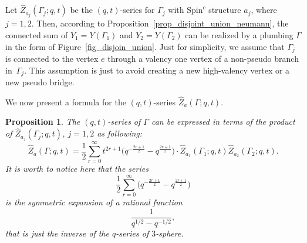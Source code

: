 \documentclass[pdftex]{sigma}
\numberwithin{equation}{section}
\newtheorem{Proposition}[Theorem]{Proposition}
\begin{document}
Let $ \hat{Z}_{a_j}(\Gamma_j; q,t) $ be the $ (q,t) $-series for $ \Gamma_j $ with $ \text{Spin}^c $ structure $ a_j $, where $ j=1,2. $ Then, according to Proposition~\ref{prop_disjoint_union_neumann}, the connected sum of $ Y_1=Y(\Gamma_1) $ and $ Y_2=Y(\Gamma_2) $ can be realized by a plumbing $ \Gamma $ in the form of Figure~\ref{fig_disjoin_union}. Just for simplicity, we assume that $ \Gamma_j $ is connected to the vertex $ e $ through a valency one vertex of a non-pseudo branch in~$ \Gamma_j $. This assumption is just to avoid creating a new high-valency vertex or a new pseudo bridge.

We now present a formula for the $ (q,t) $-series $ \hat{Z}_a(\Gamma; q,t) $.

\begin{Proposition}
	The $ (q,t) $-series of $ \Gamma $ can be expressed in terms of the product of $ \hat{Z}_{a_j}(\Gamma_j; q,t) $, $ j=1,2 $ as following:
	\begin{equation}\label{eqn_disjoint_union_formula}
		\hat{Z}_a(\Gamma; q,t)=\frac{1}{2}\sum_{r=0}^{\infty} t^{2r+1}\big(q^{-\frac{2r+1}{2}}-q^{\frac{2r+1}{2}}\big) \cdot \hat{Z}_{a_1}(\Gamma_1; q,t)\hat{Z}_{a_2}(\Gamma_2; q,t).
	\end{equation}
	It is worth to notice here that the series
	\[
	\frac{1}{2}\sum_{r=0}^{\infty} \big(q^{-\frac{2r+1}{2}}-q^{\frac{2r+1}{2}}\big)
	\]
	is the symmetric expansion of a rational function
	\[
	\frac{1}{q^{1/2}-q^{-1/2}},
	\]
	that is just the inverse of the $ q $-series of $3$-sphere.
\end{Proposition}
\end{document}
